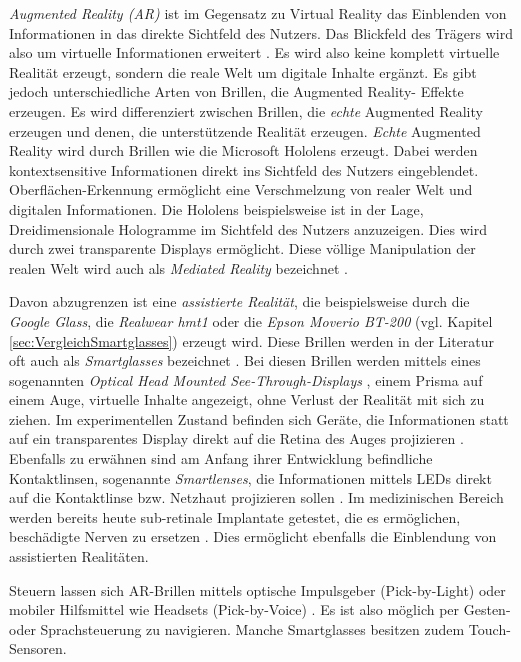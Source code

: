 \emph{Augmented Reality (AR)} ist im Gegensatz zu Virtual Reality das Einblenden von Informationen in das direkte Sichtfeld des Nutzers. Das Blickfeld des Trägers wird also um virtuelle Informationen erweitert \cite[S.~26]{Schwenke2016}. Es wird also keine komplett virtuelle Realität erzeugt, sondern die reale Welt um digitale Inhalte ergänzt. Es gibt jedoch unterschiedliche Arten von Brillen, die Augmented Reality- Effekte erzeugen. Es wird differenziert zwischen Brillen, die \emph{echte} Augmented Reality erzeugen und denen, die unterstützende Realität erzeugen. \emph{Echte} Augmented Reality wird durch Brillen wie die Microsoft Hololens erzeugt. Dabei werden kontextsensitive Informationen direkt ins Sichtfeld des Nutzers eingeblendet. Oberflächen-Erkennung ermöglicht eine Verschmelzung von realer Welt und digitalen Informationen. Die Hololens beispielsweise ist in der Lage, Dreidimensionale Hologramme im Sichtfeld des Nutzers anzuzeigen. Dies wird durch zwei transparente Displays ermöglicht. Diese völlige Manipulation der realen Welt wird auch als \emph{Mediated Reality} bezeichnet \cite[S.~46]{Schwenke2016}.

Davon abzugrenzen ist eine \emph{assistierte Realität}, die beispielsweise durch die \emph{Google Glass}, die \emph{Realwear hmt1} oder die \emph{Epson Moverio BT-200} (vgl. Kapitel \ref{sec:VergleichSmartglasses}) erzeugt wird. Diese Brillen werden in der Literatur oft auch als  \emph{Smartglasses} bezeichnet \cite[S.~26]{ThomasDirkMetzgerHelmutNiegemannHrsg2018}. Bei diesen Brillen werden mittels eines sogenannten \emph{Optical Head Mounted See-Through-Displays} \cite[S.~26]{Schwenke2016}, einem Prisma auf einem Auge, virtuelle Inhalte angezeigt, ohne Verlust der Realität mit sich zu ziehen. Im experimentellen Zustand befinden sich Geräte, die Informationen statt auf ein transparentes Display direkt auf die Retina des Auges projizieren \cite[S.~241]{Broll2013}. Ebenfalls zu erwähnen sind am Anfang ihrer Entwicklung befindliche Kontaktlinsen, sogenannte \emph{Smartlenses}, die Informationen mittels LEDs direkt auf die Kontaktlinse bzw. Netzhaut projizieren sollen \cite{Donath2014, Schwan2014}. Im medizinischen Bereich werden bereits heute sub-retinale Implantate getestet, die es ermöglichen, beschädigte Nerven zu ersetzen \cite{Young2013}. Dies ermöglicht ebenfalls die Einblendung von assistierten Realitäten.

Steuern lassen sich AR-Brillen mittels optische Impulsgeber (Pick-by-Light) oder mobiler Hilfsmittel wie Headsets (Pick-by-Voice) \cite{INTRALOGISTIK2016}. Es ist also möglich per Gesten- oder Sprachsteuerung zu navigieren. Manche Smartglasses besitzen zudem Touch-Sensoren.

